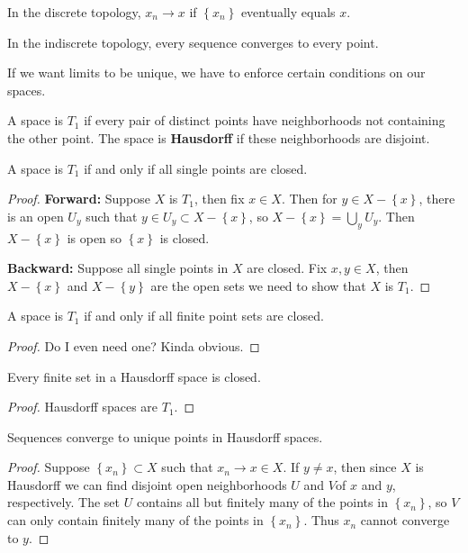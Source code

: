 \documentclass[twoside,10pt]{report}
\begin{document}
\begin{ex}[]
In the discrete topology, $x_n \to x$ if $\left\{ x_n \right\}$ eventually equals $x$.

In the indiscrete topology, every sequence converges to every point.
\end{ex}
If we want limits to be unique, we have to enforce certain conditions on our spaces.

\begin{defn}[]
A space is $T_1$ if every pair of distinct points have neighborhoods not containing the other point. The space is \textbf{Hausdorff} if these neighborhoods are disjoint.
\end{defn}

\begin{prop}
	A space is $T_1$ if and only if all single points are closed.
\end{prop}
\begin{proof}
	\textbf{Forward:} Suppose $X$ is $T_1$, then fix $x \in X$. Then for $y \in X- \left\{ x \right\}$, there is an open $U_{y}$ such that $y \in U_y \subset X - \left\{ x \right\}$, so $X - \left\{ x \right\} = \bigcup_{y}U_y$. Then $X-\left\{ x \right\}$ is open so $\left\{ x \right\}$ is closed.

	\textbf{Backward:} Suppose all single points in $X$ are closed. Fix $x,y \in X$, then $X-\left\{ x \right\}$ and $X-\left\{ y \right\}$ are the open sets we need to show that $X$ is $T_1$.
\end{proof}

\begin{cor}
	A space is $T_1$ if and only if all finite point sets are closed.
\end{cor}
\begin{proof}
	{\color{red}Do I even need one? Kinda obvious.}
\end{proof}

\begin{prop}
	Every finite set in a Hausdorff space is closed.
\end{prop}
\begin{proof}
	Hausdorff spaces are $T_1$.
\end{proof}

\begin{prop}
	Sequences converge to unique points in Hausdorff spaces.
\end{prop}
\begin{proof}
	Suppose $\left\{ x_n \right\} \subset X$ such that $x_n \to x \in X$. If $y \neq x$, then since $X$ is Hausdorff we can find disjoint open neighborhoods $U$ and $V$of $x$ and $y$, respectively. The set $U$ contains all but finitely many of the points in $\left\{ x_n \right\}$, so $V$ can only contain finitely many of the points in $\left\{ x_n \right\}$. Thus $x_n$ cannot converge to $y$.
\end{proof}
\end{document}
